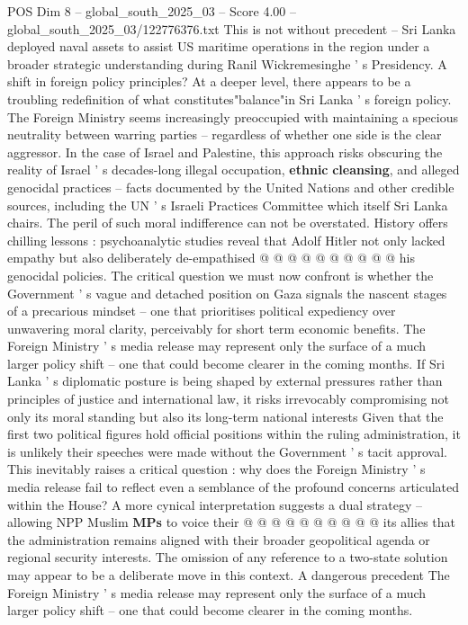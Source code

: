 \begin{textsample}{POS Dim 8 – global\_south\_2025\_03 – Score 4.00 – global\_south\_2025\_03/122776376.txt}
This is not without precedent -- Sri Lanka deployed naval assets to assist US maritime operations in the region under a broader strategic understanding during Ranil Wickremesinghe ' s Presidency.
A shift in foreign policy principles?
At a deeper level, there appears to be a troubling redefinition of what constitutes"balance"in Sri Lanka ' s foreign policy.
The Foreign Ministry seems increasingly preoccupied with maintaining a specious neutrality between warring parties -- regardless of whether one side is the clear aggressor.
In the case of Israel and Palestine, this approach risks obscuring the reality of Israel ' s decades-long illegal occupation, \textbf{ethnic} \textbf{cleansing}, and alleged genocidal practices -- facts documented by the United Nations and other credible sources, including the UN ' s Israeli Practices Committee which itself Sri Lanka chairs.
The peril of such moral indifference can not be overstated.
History offers chilling lessons : psychoanalytic studies reveal that Adolf Hitler not only lacked empathy but also deliberately de-empathised @ @ @ @ @ @ @ @ @ @ his genocidal policies.
The critical question we must now confront is whether the Government ' s vague and detached position on Gaza signals the nascent stages of a precarious mindset -- one that prioritises political expediency over unwavering moral clarity, perceivably for short term economic benefits.
The Foreign Ministry ' s media release may represent only the surface of a much larger policy shift -- one that could become clearer in the coming months.
If Sri Lanka ' s diplomatic posture is being shaped by external pressures rather than principles of justice and international law, it risks irrevocably compromising not only its moral standing but also its long-term national interests Given that the first two political figures hold official positions within the ruling administration, it is unlikely their speeches were made without the Government ' s tacit approval.
This inevitably raises a critical question : why does the Foreign Ministry ' s media release fail to reflect even a semblance of the profound concerns articulated within the House?
A more cynical interpretation suggests a dual strategy -- allowing NPP Muslim \textbf{MPs} to voice their @ @ @ @ @ @ @ @ @ @ its allies that the administration remains aligned with their broader geopolitical agenda or regional security interests.
The omission of any reference to a two-state solution may appear to be a deliberate move in this context.
A dangerous precedent The Foreign Ministry ' s media release may represent only the surface of a much larger policy shift -- one that could become clearer in the coming months.

\end{textsample}
